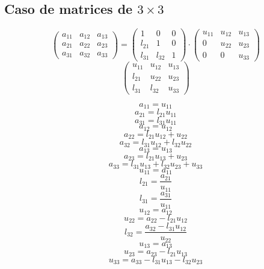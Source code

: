 \documentclass[10pt,a4paper,dvipdfmx]{article}
\begin{document}
\subsection{Caso de matrices de $3\times 3$ }
$$ \left( 
\begin{array}{ccc}
a_{{1}{1}} & a_{{1}{2}} & a_{{1}{3}} \\
a_{{2}{1}} & a_{{2}{2}} & a_{{2}{3}} \\
a_{{3}{1}} & a_{{3}{2}} & a_{{3}{3}} 
 \end{array}
\right)
 = \left( 
\begin{array}{ccc}
1 & 0 & 0 \\
l_{{2}{1}} & 1 & 0 \\
l_{{3}{1}} & l_{{3}{2}} & 1 
 \end{array}
\right)
 \cdot \left( 
\begin{array}{ccc}
u_{{1}{1}} & u_{{1}{2}} & u_{{1}{3}} \\
0 & u_{{2}{2}} & u_{{2}{3}} \\
0 & 0 & u_{{3}{3}} 
 \end{array}
\right)
 $$
$$ \left( 
\begin{array}{ccc}
u_{{1}{1}} & u_{{1}{2}} & u_{{1}{3}} \\
l_{{2}{1}} & u_{{2}{2}} & u_{{2}{3}} \\
l_{{3}{1}} & l_{{3}{2}} & u_{{3}{3}} 
 \end{array}
\right)
 $$
\begin{multicols}{2}
$$ a_{{1}{1}} = u_{{1}{1}} $$
$$ a_{{2}{1}} = l_{{2}{1}} u_{{1}{1}} $$
$$ a_{{3}{1}} = l_{{3}{1}} u_{{1}{1}} $$
$$ a_{{1}{2}} = u_{{1}{2}} $$
$$ a_{{2}{2}} = l_{{2}{1}} u_{{1}{2}} + u_{{2}{2}} $$
$$ a_{{3}{2}} = l_{{3}{1}} u_{{1}{2}} + l_{{3}{2}} u_{{2}{2}} $$
$$ a_{{1}{3}} = u_{{1}{3}} $$
$$ a_{{2}{3}} = l_{{2}{1}} u_{{1}{3}} + u_{{2}{3}} $$
$$ a_{{3}{3}} = l_{{3}{1}} u_{{1}{3}} + l_{{3}{2}} u_{{2}{3}} + u_{{3}{3}} $$
\vfill\null
\columnbreak
$$ u_{{1}{1}} = a_{{1}{1}} $$
$$ l_{{2}{1}} = \dfrac{a_{{2}{1}}}{u_{{1}{1}}} $$
$$ l_{{3}{1}} = \dfrac{a_{{3}{1}}}{u_{{1}{1}}} $$
$$ u_{{1}{2}} = a_{{1}{2}} $$
$$ u_{{2}{2}} = a_{{2}{2}}- l_{{2}{1}} u_{{1}{2}} $$
$$ l_{{3}{2}} = \dfrac{a_{{3}{2}}- l_{{3}{1}} u_{{1}{2}}}{u_{{2}{2}}} $$
$$ u_{{1}{3}} = a_{{1}{3}} $$
$$ u_{{2}{3}} = a_{{2}{3}}- l_{{2}{1}} u_{{1}{3}} $$
$$ u_{{3}{3}} = a_{{3}{3}}- l_{{3}{1}} u_{{1}{3}}- l_{{3}{2}} u_{{2}{3}} $$
\end{multicols}
\end{document}
